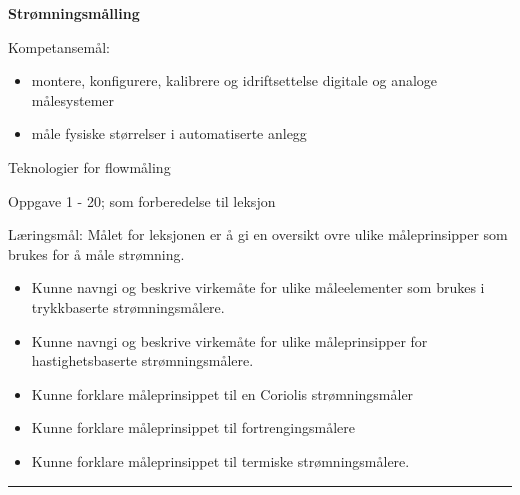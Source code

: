 \centerline{\bf Strømningsmålling}  \bigskip

Kompetansemål:
\begin{itemize}[noitemsep]

	\item montere, konfigurere, kalibrere og idriftsettelse digitale og analoge målesystemer
	\item måle fysiske størrelser i automatiserte anlegg
\end{itemize}
\vskip 2cm

\noindent {}

\vskip 5pt


\vskip 2pt  Teknologier for flowmåling

\vskip 2pt \noindent Oppgave 1 - 20;  som forberedelse til leksjon %

\vskip 10pt

	Læringsmål:
	Målet for leksjonen er å gi en oversikt ovre ulike måleprinsipper som brukes for å måle strømning. 
	\begin{itemize}[noitemsep]
		\item Kunne navngi og beskrive virkemåte for ulike måleelementer som brukes i trykkbaserte strømningsmålere.%
		\item Kunne navngi og beskrive virkemåte for ulike måleprinsipper for hastighetsbaserte strømningsmålere.
		\item Kunne forklare måleprinsippet til en Coriolis strømningsmåler
		\item Kunne forklare måleprinsippet til fortrengingsmålere
		\item Kunne forklare måleprinsippet til termiske strømningsmålere. 
	\end{itemize}


\filbreak
\hrule \vskip 5pt
\noindent {}

\vskip 5pt


